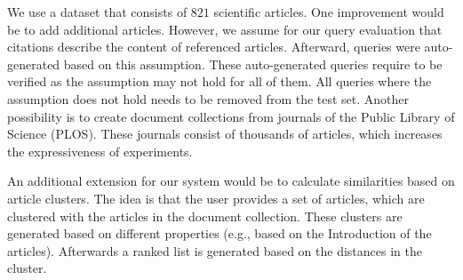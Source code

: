 We use a dataset that consists of $821$ scientific articles. One improvement would be to add additional articles. However, we assume for our query evaluation that citations describe the content of referenced articles. Afterward, queries were auto-generated based on this assumption. These auto-generated queries require to be verified as the assumption may not hold for all of them. All queries where the assumption does not hold needs to be removed from the test set. Another possibility is to create document collections from journals of the Public Library of Science (PLOS). These journals consist of thousands of articles, which increases the expressiveness of experiments.

An additional extension for our system would be to calculate similarities based on article clusters. The idea is that the user provides a set of articles, which are clustered with the articles in the document collection. These clusters are generated based on different properties (e.g., based on the Introduction of the articles). Afterwards a ranked list is generated based on the distances in the cluster.
